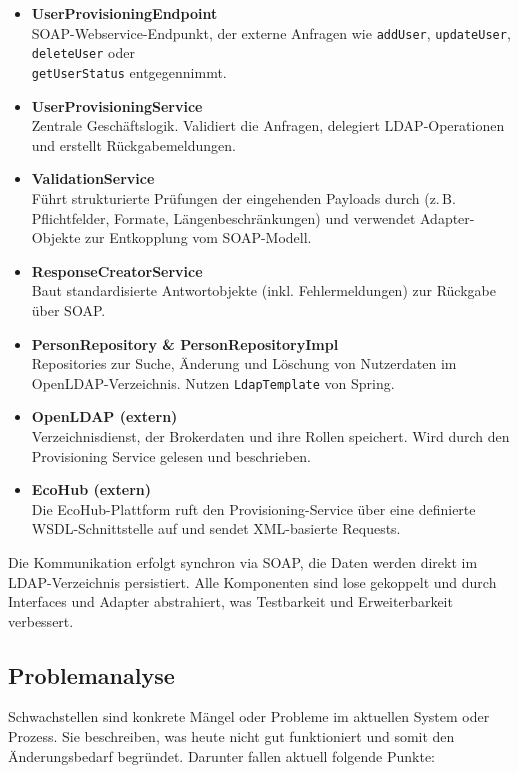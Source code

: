 \begin{itemize}
    \item \textbf{UserProvisioningEndpoint} \\
    SOAP-Webservice-Endpunkt, der externe Anfragen wie \texttt{addUser}, \texttt{updateUser}, \texttt{deleteUser} oder \\ \texttt{getUserStatus} entgegennimmt.

    \item \textbf{UserProvisioningService} \\
    Zentrale Geschäftslogik. Validiert die Anfragen, delegiert LDAP-Operationen und erstellt Rückgabemeldungen.

    \item \textbf{ValidationService} \\
    Führt strukturierte Prüfungen der eingehenden Payloads durch (z.\,B. Pflichtfelder, Formate, Längenbeschränkungen) und verwendet Adapter-Objekte zur Entkopplung vom SOAP-Modell.

    \item \textbf{ResponseCreatorService} \\
    Baut standardisierte Antwortobjekte (inkl. Fehlermeldungen) zur Rückgabe über SOAP.

    \item \textbf{PersonRepository \& PersonRepositoryImpl} \\
    Repositories zur Suche, Änderung und Löschung von Nutzerdaten im OpenLDAP-Verzeichnis. Nutzen \texttt{LdapTemplate} von Spring.

    \item \textbf{OpenLDAP (extern)} \\
    Verzeichnisdienst, der Brokerdaten und ihre Rollen speichert. Wird durch den Provisioning Service gelesen und beschrieben.

    \item \textbf{EcoHub (extern)} \\
    Die EcoHub-Plattform ruft den Provisioning-Service über eine definierte WSDL-Schnittstelle auf und sendet XML-basierte Requests.
\end{itemize}

Die Kommunikation erfolgt synchron via SOAP, die Daten werden direkt im LDAP-Verzeichnis persistiert. Alle Komponenten sind lose gekoppelt und durch Interfaces und Adapter abstrahiert, was Testbarkeit und Erweiterbarkeit verbessert.


\subsection{Problemanalyse}
\label{sec:problemanalyse}
Schwachstellen sind konkrete Mängel oder Probleme im aktuellen System oder Prozess. Sie beschreiben, was heute nicht gut funktioniert und somit den Änderungsbedarf begründet. Darunter fallen aktuell folgende Punkte:

